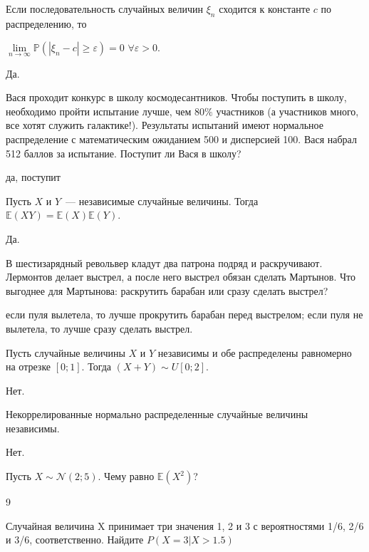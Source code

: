 \documentclass[12pt, addpoints]{exam} %
\begin{document}
\begin{questions}


\question Если последовательность случайных величин $\xi_n$ сходится к константе $c$ по распределению, то

$\lim\limits_{n\to\infty}\mathbb{P}(|\xi_n - c| \ge \varepsilon) = 0\,\,\forall \varepsilon > 0$.
\begin{solution}
Да.
\end{solution}

\question Вася проходит конкурс в школу космодесантников. Чтобы поступить в школу, необходимо пройти испытание лучше, чем 80$\%$ участников (а участников много, все хотят служить галактике!). Результаты испытаний имеют нормальное распределение с математическим ожиданием 500 и дисперсией 100. Вася набрал 512 баллов за испытание. Поступит ли Вася в школу?
\begin{solution}
да, поступит
\end{solution}



\question Пусть $X$ и $Y$~--- независимые случайные величины. Тогда $\mathbb{E}(XY) = \mathbb{E}(X)\mathbb{E}(Y)$. \begin{solution}
Да.
\end{solution}

\question В шестизарядный револьвер кладут два патрона подряд и раскручивают. Лермонтов делает выстрел, а после него выстрел обязан сделать Мартынов. Что выгоднее для Мартынова: раскрутить барабан или сразу сделать выстрел?
\begin{solution}
если пуля вылетела, то  лучше прокрутить барабан перед выстрелом; если пуля не вылетела, то  лучше сразу сделать выстрел.
\end{solution}

\question Пусть случайные величины $X$ и $Y$ независимы и обе распределены равномерно на отрезке $[0;1]$. Тогда $(X+Y)\sim U[0;2]$.
\begin{solution}
Нет.
\end{solution}


\question Некоррелированные нормально распределенные случайные величины независимы.
\begin{solution}
Нет.
\end{solution}

\question Пусть $X\sim \mathcal{N}(2; 5)$. Чему равно $\mathbb{E}(X^2)$?
\begin{solution}
9
\end{solution}

\question Случайная величина X принимает три значения 1, 2 и 3 с вероятностями 1/6, 2/6 и 3/6, соответственно. Найдите $P(X=3|X>1.5)$


\end{questions}
\end{document}
